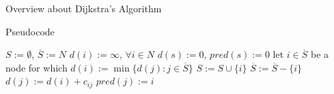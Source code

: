 \documentclass[9pt]{extarticle}
\begin{document}
\begin{section}{Overview about Dijkstra's Algorithm}
\begin{subsection}{Pseudocode}
            \begin{algorithm}
                \caption{Dijkstra's Algorithm}\label{alg:dijkstra}
                \begin{algorithmic}[1]
                        \State $S := \emptyset$, $\overline{S}:=N$
                        \State $d(i) := \infty$, $\forall i \in N$
                        \State $d(s) := 0$, $pred(s) := 0$
                            \State let $i \in \overline{S}$ be a node for which $d(i) := \min\{d(j) : j \in \overline{S}\}$
                            \State $S := S \cup \{i\}$
                            \State $\overline{S} := \overline{S} - \{i\}$
                                    \State $d(j) := d(i) + c_{ij}$
                                    \State $pred(j) := i$
                                \EndIf
                            \EndFor
                        \EndWhile
                    \EndProcedure
                \end{algorithmic}   
            \end{algorithm}    
            \vspace{10px}     
        \end{subsection}
    \end{section}
\end{document}
